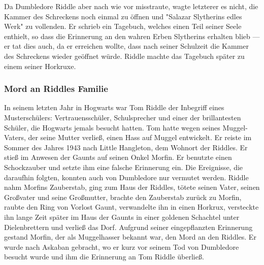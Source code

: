 \documentclass[a4paper, 10pt]{article}
\begin{document}
\vspace{10pt}
\newline
Da Dumbledore Riddle aber nach wie vor misstraute, wagte letzterer es nicht, die Kammer des Schreckens noch einmal zu öffnen 
und "Salazar Slytherins edles Werk" zu vollenden. Er schrieb ein Tagebuch, welches einen Teil seiner Seele enthielt, so dass die Erinnerung an den wahren Erben Slytherins erhalten blieb — er tat dies auch, da er erreichen wollte, dass nach seiner Schulzeit die Kammer des Schreckens wieder geöffnet würde. Riddle machte das Tagebuch später zu einem seiner Horkruxe.

\subsubsection*{\large Mord an Riddles Familie}
In seinem letzten Jahr in Hogwarts war Tom Riddle der Inbegriff eines Musterschülers: Vertrauensschüler, Schulsprecher und einer der brillantesten Schüler, die Hogwarts jemals besucht hatten.
\vspace{10pt}
\newline
Tom hatte wegen seines Muggel-Vaters, der seine Mutter verließ, einen Hass auf Muggel entwickelt. Er reiste im Sommer des Jahres 1943 nach Little Hangleton, dem Wohnort der Riddles. Er stieß im Anwesen der Gaunts auf seinen Onkel Morfin. Er benutzte einen Schockzauber und setzte ihm eine falsche Erinnerung ein. Die Ereignisse, die daraufhin folgten, konnten auch von Dumbledore nur vermutet werden. Riddle nahm Morfins Zauberstab, ging zum Haus der Riddles, tötete seinen Vater, seinen Großvater und seine Großmutter, brachte den Zauberstab zurück zu Morfin, raubte den Ring von Vorlost Gaunt, verwandelte ihn in einen Horkrux, versteckte ihn lange Zeit später im Haus der Gaunts in einer goldenen Schachtel unter Dielenbrettern und verließ das Dorf.
\vspace{10pt}
\newline
Aufgrund seiner eingepflanzten Erinnerung gestand Morfin, der als Muggelhasser bekannt war, den Mord an den Riddles. Er wurde nach Askaban gebracht, wo er kurz vor seinem Tod von Dumbledore besucht wurde und ihm die Erinnerung an Tom Riddle überließ.
\end{document}
